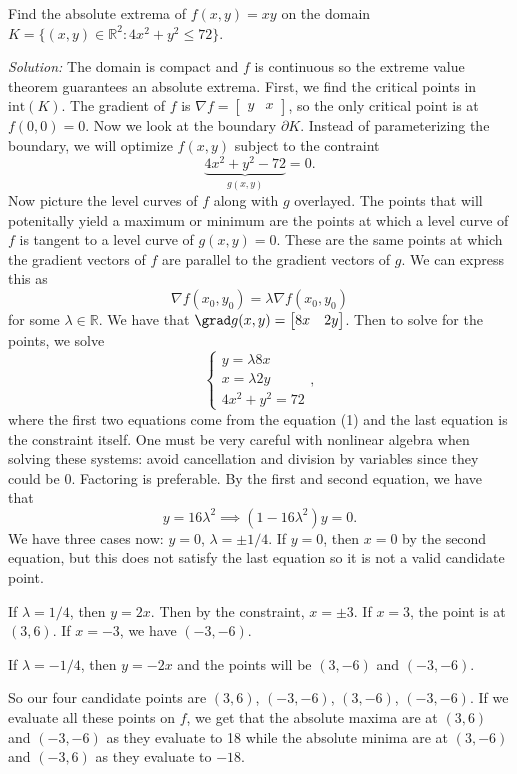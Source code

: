 \documentclass[11pt]{article}
\theoremstyle{definition}
\newcommand{\R}{\mathbb{R}}                      %
\newcommand{\mat}{\begin{bmatrix}}
\newcommand{\trix}{\end{bmatrix}}
\newcommand{\dell}{\partial}
\begin{document}
\ex Find the absolute extrema of $f(x,y)=xy$ on the domain $K=\{(x,y)\in \R^2 : 4x^2+y^2\leq 72\}$. 

\textit{Solution:} The domain is compact and $f$ is continuous so the extreme value theorem guarantees an absolute extrema. First, we find the critical points in $\mathrm{int}(K)$. The gradient of $f$ is $\nabla f=\mat y & x \trix$, so the only critical point is at $f(0,0)=0$. Now we look at the boundary $\dell K$. Instead of parameterizing the boundary, we will optimize $f(x,y)$ subject to the contraint 
$$
\underbrace{4x^2+y^2-72}_{g(x,y)}=0.
$$
Now picture the level curves of $f$ along with $g$ overlayed. The points that will potenitally yield a maximum or minimum are the points at which a level curve of $f$ is tangent to a level curve of $g(x,y)=0$. These are the same points at which the gradient vectors of $f$ are parallel to the gradient vectors of $g$. We can express this as
\begin{equation}
\nabla f(x_0,y_0)=\lambda \nabla f(x_0,y_0)
\end{equation}
for some $\lambda\in\R$. We have that $\grad g(x,y)=\mat 8x & 2y \trix$. Then to solve for the points, we solve
$$
\begin{cases}
y=\lambda8 x\\
x=\lambda 2y\\
4x^2+y^2=72
\end{cases},
$$
where the first two equations come from the equation (1) and the last equation is the constraint itself. One must be very careful with nonlinear algebra when solving these systems: avoid cancellation and division by variables since they could be 0. Factoring is preferable. By the first and second equation, we have that 
$$
y=16\lambda^2\implies (1-16\lambda^2)y=0.
$$
We have three cases now: $y=0$, $\lambda =\pm 1/4$. If $y=0$, then $x=0$ by the second equation, but this does not satisfy the last equation so it is not a valid candidate point. 

If $\lambda = 1/4$, then $y=2x$. Then by the constraint, $x=\pm 3$. If $x=3$, the point is at $(3,6)$. If $x=-3$, we have $(-3,-6)$.

If $\lambda = -1/4$, then $y=-2x$ and the points will be $(3,-6)$ and $(-3,-6)$.

So our four candidate points are $(3,6)$, $(-3,-6)$, $(3,-6)$, $(-3,-6)$. If we evaluate all these points on $f$, we get that the absolute maxima are at $(3,6)$ and $(-3,-6)$ as they evaluate to 18 while the absolute minima are at $(3,-6)$ and $(-3,6)$ as they evaluate to $-18$.
\end{document}

